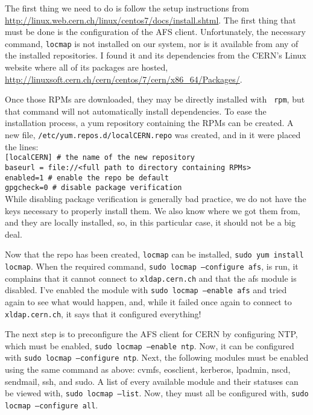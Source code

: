 \documentclass[12pt]{article}
\begin{document}
\qq The first thing we need to do is follow the setup instructions from
\url{http://linux.web.cern.ch/linux/centos7/docs/install.shtml}. The first thing
that must be done is the configuration of the AFS client. Unfortunately, the
necessary command, {\tt locmap} is not installed on our system, nor is it
available from any of the installed repositories. I found it and its
dependencies from the CERN's Linux website where all of its packages are hosted,
\url{http://linuxsoft.cern.ch/cern/centos/7/cern/x86_64/Packages/}.

\qq Once those RPMs are downloaded, they may be directly installed with {\tt
  rpm}, but that command will not automatically install dependencies. To ease
the installation process, a yum repository containing the RPMs can be created. A
new file, {\tt /etc/yum.repos.d/localCERN.repo} was created, and in it were
placed the lines: \\
{\tt [localCERN] \# the name of the new repository} \\
{\tt baseurl = file://<full path to directory containing RPMs>} \\
{\tt enabled=1 \# enable the repo be default} \\
{\tt gpgcheck=0 \# disable package verification} \\
While disabling package verification is generally bad practice, we do not have
the keys necessary to properly install them. We also know where we got them
from, and they are locally installed, so, in this particular case, it should not
be a big deal.

\qq Now that the repo has been created, {\tt locmap} can be installed, {\tt sudo
  yum install locmap}. When the required command, {\tt sudo locmap --configure
  afs}, is run, it complains that it cannot connect to {\tt xldap.cern.ch} and
that the afs module is disabled. I've enabled the module with {\tt sudo locmap
  --enable afs} and tried again to see what would happen, and, while it failed
once again to connect to {\tt xldap.cern.ch}, it says that it configured
everything!

\qq The next step is to preconfigure the AFS client for CERN by configuring NTP,
which must be enabled, {\tt sudo locmap --enable ntp}. Now, it can be configured
with {\tt sudo locmap --configure ntp}. Next, the following modules must be
enabled using the same command as above: cvmfs, eosclient, kerberos, lpadmin,
nscd, sendmail, ssh, and sudo. A list of every available module and their
statuses can be viewed with, {\tt sudo locmap --list}. Now, they must all be
configured with, {\tt sudo locmap --configure all}. 
\end{document}
